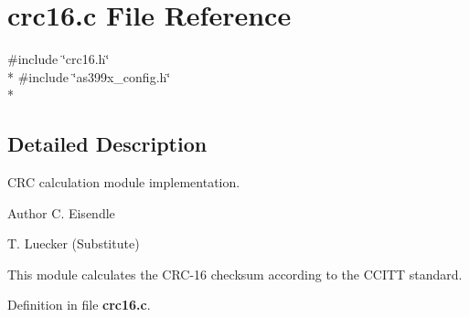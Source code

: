 \section{crc16.\-c File Reference}
\label{crc16_8c}
{\ttfamily \#include \char`\"{}crc16.\-h\char`\"{}}\\*
{\ttfamily \#include \char`\"{}as399x\-\_\-config.\-h\char`\"{}}\\*


\subsection{Detailed Description}
C\-R\-C calculation module implementation. \begin{DoxyAuthor}{Author}
C. Eisendle 

T. Luecker (Substitute)
\end{DoxyAuthor}
This module calculates the C\-R\-C-\/16 checksum according to the C\-C\-I\-T\-T standard. 

Definition in file {\bf crc16.\-c}.

